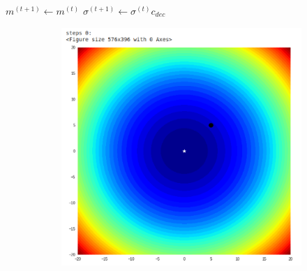\documentclass{book}
\begin{document}
\begin{itemize}
\begin{algorithm}[]
\begin{algorithmic}[1]
            \ELSE
                \STATE $m^{(t+1)}\gets m^{(t)}$
                \STATE $\sigma^{(t+1)}\gets \sigma^{(t)}c_{dec}$
                \ENDIF
        \ENDFOR
        \end{algorithmic}
    \end{algorithm}
    \begin{figure}[H]
        \begin{figure}[H]
            \begin{minipage}[c]{0.3\textwidth}
                \centering
                \includegraphics[width=\textwidth]{images/one_plus_lambda_ex_step_0.png}
            \end{minipage}
            \begin{minipage}[c]{0.3\textwidth}
                \centering

\end{minipage}
\end{figure}
\end{figure}
\end{itemize}
\end{document}
